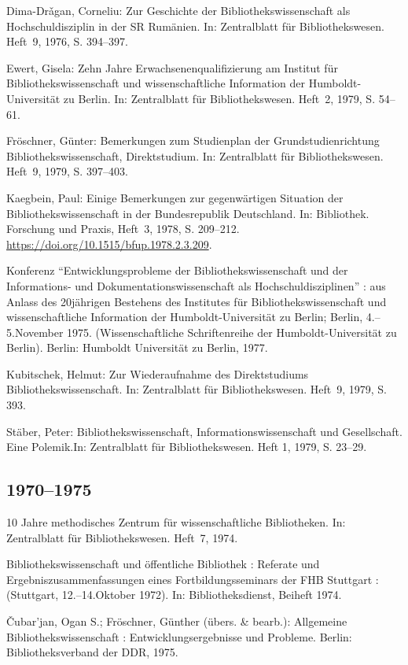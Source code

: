 \documentclass[a4paper,
fontsize=11pt,
oneside,
numbers=noperiodatend,
parskip=half-,
bibliography=totoc,
final
]{scrartcl}
\begin{document}
Dima-Drǎgan, Corneliu: Zur Geschichte der Bibliothekswissenschaft als
Hochschuldisziplin in der SR Rumänien. In: Zentralblatt für
Bibliothekswesen. Heft~9, 1976, S. 394--397.

Ewert, Gisela: Zehn Jahre Erwachsenenqualifizierung am Institut für
Bibliothekswissenschaft und wissenschaftliche Information der
Humboldt-Universität zu Berlin. In: Zentralblatt für Bibliothekswesen.
Heft~2, 1979, S. 54--61.

Fröschner, Günter: Bemerkungen zum Studienplan der Grundstudienrichtung
Bibliothekswissenschaft, Direktstudium. In: Zentralblatt für
Bibliothekswesen. Heft~9, 1979, S. 397--403.

Kaegbein, Paul: Einige Bemerkungen zur gegenwärtigen Situation der
Bibliothekswissenschaft in der Bundesrepublik Deutschland. In:
Bibliothek. Forschung und Praxis, Heft~3, 1978, S. 209--212.
\url{https://doi.org/10.1515/bfup.1978.2.3.209}.

Konferenz \enquote{Entwicklungsprobleme der Bibliothekswissenschaft und
der Informations- und Dokumentationswissenschaft als
Hochschuldisziplinen} : aus Anlass des 20jährigen Bestehens des
Institutes für Bibliothekswissenschaft und wissenschaftliche Information
der Humboldt-Univer\-sität zu Berlin; Berlin, 4.--5.November 1975.
(Wissenschaftliche Schriftenreihe der Humboldt-Universität zu Berlin).
Berlin: Humboldt Universität zu Berlin, 1977.

Kubitschek, Helmut: Zur Wiederaufnahme des Direktstudiums
Bibliothekswissenschaft. In: Zentralblatt für Bibliothekswesen. Heft~9,
1979, S. 393.

Stäber, Peter: Bibliothekswissenschaft, Informationswissenschaft und
Gesellschaft. Eine Polemik.In: Zentralblatt für Bibliothekswesen. Heft
1, 1979, S. 23--29.

\hypertarget{section-5}{%
\subsection*{1970--1975}\label{section-5}}

10 Jahre methodisches Zentrum für wissenschaftliche Bibliotheken. In:
Zentralblatt für Bibliothekswesen. Heft~7, 1974.

Bibliothekswissenschaft und öffentliche Bibliothek : Referate und
Ergebniszusammenfassungen eines Fortbildungsseminars der FHB Stuttgart :
(Stuttgart, 12.--14.Oktober 1972). In: Bibliotheksdienst, Beiheft 1974.

Čubar'jan, Ogan S.; Fröschner, Günther (übers. \& bearb.): Allgemeine
Bibliothekswissenschaft : Entwicklungsergebnisse und Probleme. Berlin:
Bibliotheksverband der DDR, 1975.
\end{document}
